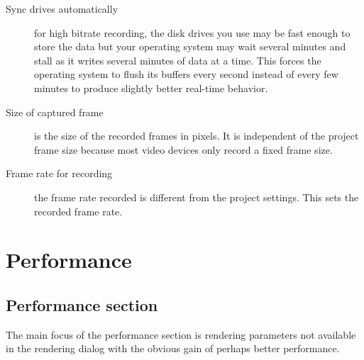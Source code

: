 \begin{description}
    \item[Sync drives automatically] for high bitrate recording, the disk drives you use may be fast enough to store the data but your operating system may wait several minutes and stall as it writes several minutes of data at a time. This forces the operating system to flush its buffers every second instead of every few minutes to produce slightly better real-time behavior.
    \item[Size of captured frame] is the size of the recorded frames in pixels. It is independent of the project frame size because most video devices only record a fixed frame size.
    \item[Frame rate for recording ] the frame rate recorded is different from the project settings. This sets the recorded frame rate.
\end{description}

\section{Performance}%
\label{sec:performance}

\subsection{Performance section}%
\label{sub:performance_section}

The main focus of the performance section is rendering parameters not available in the rendering dialog with the obvious gain of perhaps better performance.

